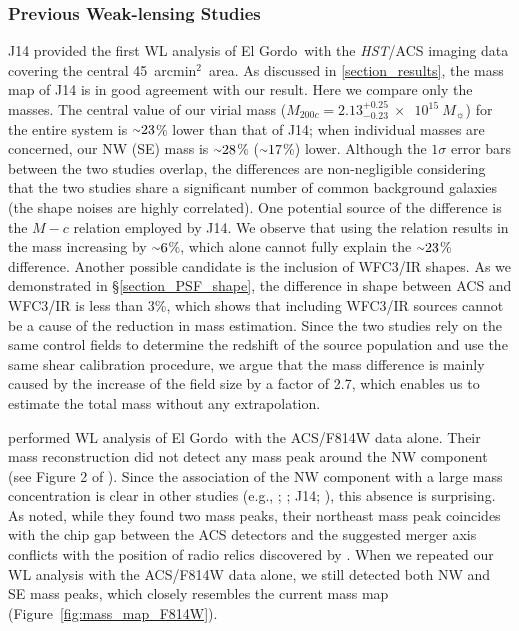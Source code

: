\documentclass[twocolumn]{aastex631}
\newcommand{\elgordo}{El Gordo}
\newcommand{\HST}{{\it HST}}
\newcommand{\mytilde}{\raise.19ex\hbox{$\scriptstyle\sim$}}
\newcommand{\solarmA}{$10^{15}~M_{\sun}$}
\newcommand{\sqarcmin}{arcmin$^{2}$}
\begin{document}
\subsubsection{Previous Weak-lensing Studies} \label{mass_compare_WL}
J14 provided the first WL analysis of \elgordo~with the \HST/ACS imaging data covering the central 45~\sqarcmin~area. 
As discussed in \textsection\ref{section_results}, the mass map of J14 is in good agreement with our result. Here we compare only the masses. 
The central value of our virial mass ($M_{200c} = 2.13^{+0.25}_{-0.23}~\times$~\solarmA) for the entire system is $\mytilde23$\% lower than that of J14; when individual masses are concerned, our NW (SE) mass is $\mytilde28$\% ($\mytilde17$\%) lower. 
Although the $1\sigma$ error bars between the two studies overlap, the differences are non-negligible considering that the two studies share a significant number of common background galaxies (the shape noises are highly correlated). One potential source of the difference is the $M-c$ relation employed by J14. We observe that using the relation results in the mass increasing by $\mytilde6$\%, which alone cannot fully explain the $\mytilde23$\% difference. 
Another possible candidate is the inclusion of WFC3/IR shapes. As we demonstrated in \S\ref{section_PSF_shape}, the difference in shape between ACS and WFC3/IR is less than $3$\%, which shows that including WFC3/IR sources cannot be a cause of the reduction in mass estimation. 
Since the two studies rely on the same control fields to determine the redshift of the source population and use the same shear calibration procedure, we argue that the mass difference is mainly caused by the increase of the field size by a factor of 2.7, which enables us to estimate the total mass without any extrapolation. 


\cite{Harvey2015} performed WL analysis of \elgordo~with the ACS/F814W data alone. Their mass reconstruction did not detect any mass peak around the NW component (see Figure 2 of \citealt{Harvey2015}). Since the association of the NW component with a large mass concentration is clear in other studies (e.g., \citealt{Zitrin2013}; \citealt{Diego2020}; J14; \citealt{Schrabback2018}), this absence is surprising. 
As \cite{Wittman2018} noted, while they found two mass peaks, their northeast mass peak coincides with the chip gap between the ACS detectors and the suggested merger axis conflicts with the position of radio relics discovered by \cite{Lindner2014}. 
When we repeated our WL analysis with the ACS/F814W data alone, we still detected both NW and SE mass peaks, which closely resembles the current mass map (Figure~\ref{fig:mass_map_F814W}).
\end{document}
